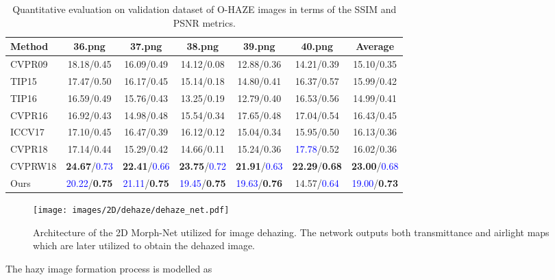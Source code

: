 \documentclass[12pt]{article}
\begin{document}
\begin{table*}
    \centering 
    \caption{Quantitative evaluation on validation dataset of O-HAZE images in terms of the SSIM and PSNR metrics.} 
    \begin{tabular}{l|cccccc}
    \toprule 
    Method & 36.png & 37.png & 38.png & 39.png & 40.png & Average\\
    \midrule
    CVPR09\cite{he2010single} & 18.18/0.45 & 16.09/0.49 & 14.12/0.08 & 12.88/0.36 & 14.21/0.39 & 15.10/0.35\\
    TIP15\cite{zhu2015fast} & 17.47/0.50 & 16.17/0.45 & 15.14/0.18 & 14.80/0.41 & 16.37/0.57 & 15.99/0.42\\
    TIP16\cite{ren2016single} & 16.59/0.49 & 15.76/0.43 & 13.25/0.19 & 12.79/0.40 & 16.53/0.56 & 14.99/0.41\\
    CVPR16\cite{cai2016dehazenet} & 16.92/0.43 & 14.98/0.48 & 15.54/0.34 & 17.65/0.48 & 17.04/0.54 & 16.43/0.45 \\
    ICCV17\cite{li2017aod} & 17.10/0.45 & 16.47/0.39 & 16.12/0.12 & 15.04/0.34 & 15.95/0.50 & 16.13/0.36\\
    CVPR18\cite{zhang2018densely} & 17.14/0.44 & 15.29/0.42 & 14.66/0.11 & 15.24/0.36 & \textcolor{blue}{17.78}/0.52 & 16.02/0.36\\
    CVPRW18\cite{zhang2018multi} & \textbf{24.67}/\textcolor{blue}{0.73} & \textbf{22.41}/\textcolor{blue}{0.66} & \textbf{23.75}/\textcolor{blue}{0.72} & \textbf{21.91}/\textcolor{blue}{0.63} & \textbf{22.29}/\textbf{0.68} & \textbf{23.00}/\textcolor{blue}{0.68}\\
    Ours &\textcolor{blue}{20.22}/\textbf{0.75} & \textcolor{blue}{21.11}/\textbf{0.75} & \textcolor{blue}{19.45}/\textbf{0.75}&  \textcolor{blue}{19.63}/\textbf{0.76}  & 14.57/\textcolor{blue}{0.64} & \textcolor{blue}{19.00}/\textbf{0.73}\\
    \bottomrule 
\end{tabular}
    \label{quant_haze_ntire}
\end{table*}


\begin{figure*}
    \centering
    \texttt{[image: images/2D/dehaze/dehaze\_net.pdf]}
    \caption{Architecture of the 2D Morph-Net utilized for image dehazing. The network outputs both transmittance and airlight maps which are later utilized to obtain the dehazed image. }
    \label{fig:dehaze_net}
\end{figure*}

The hazy image formation process is modelled as~\cite{kosch}  
\end{document}
